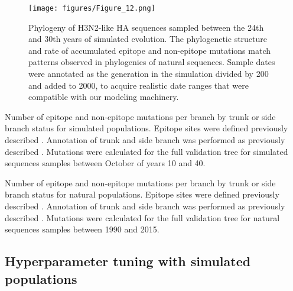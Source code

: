 \begin{figure}
  \begin{center}
  \texttt{[image: figures/Figure\_12.png]}
  \caption{
  Phylogeny of H3N2-like HA sequences sampled between the 24th and 30th years of simulated evolution.
  The phylogenetic structure and rate of accumulated epitope and non-epitope mutations match patterns observed in phylogenies of natural sequences.
  Sample dates were annotated as the generation in the simulation divided by 200 and added to 2000, to acquire realistic date ranges that were compatible with our modeling machinery.
  }
  \label{fig:simulated_h3n2_ha_phylogeny}
  \end{center}
\end{figure}

\begin{table}
  \begin{center}
    
    \caption{
    Number of epitope and non-epitope mutations per branch by trunk or side branch status for simulated populations.
    Epitope sites were defined previously described \citep{Luksza:2014hj}.
    Annotation of trunk and side branch was performed as previously described \citep{Bedford:2015fj}.
    Mutations were calculated for the full validation tree for simulated sequences samples between October of years 10 and 40.
    }
    \label{table:mutations_by_trunk_status_for_simulated_populations}
  \end{center}
\end{table}

\begin{table}
  \begin{center}
    
    \caption{
    Number of epitope and non-epitope mutations per branch by trunk or side branch status for natural populations.
    Epitope sites were defined previously described \citep{Luksza:2014hj}.
    Annotation of trunk and side branch was performed as previously described \citep{Bedford:2015fj}.
    Mutations were calculated for the full validation tree for natural sequences samples between 1990 and 2015.
    }
    \label{table:mutations_by_trunk_status}
  \end{center}
\end{table}

\subsection*{Hyperparameter tuning with simulated populations}

